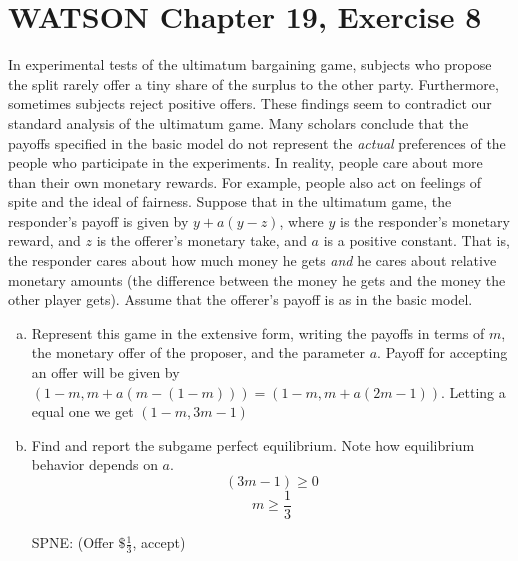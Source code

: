 \documentclass{article}
\begin{document}
\section{WATSON Chapter 19, Exercise 8}
In experimental tests of the ultimatum bargaining game, subjects who propose the split rarely offer a tiny share of the surplus to the other party.
Furthermore, sometimes subjects reject positive offers.
These findings seem to contradict our standard analysis of the ultimatum game.
Many scholars conclude that the payoffs specified in the basic model do not represent the \emph{actual} preferences of the people who participate in the experiments.
In reality, people care about more than their own monetary rewards.
For example, people also act on feelings of spite and the ideal of fairness.
Suppose that in the ultimatum game, the responder's payoff is given by $y + a(y-z)$, where $y$ is the responder's monetary reward, and $z$ is the offerer's monetary take, and $a$ is a positive constant.
That is, the responder cares about how much money he gets \emph{and} he cares about relative monetary amounts (the difference between the money he gets and the money the other player gets).
Assume that the offerer's payoff is as in the basic model.

\begin{enumerate}[(a)]
\item Represent this game in the extensive form, writing the payoffs in terms of $m$, the monetary offer of the proposer, and the parameter $a$.
\newline
Payoff for accepting an offer will be given by $(1-m, m + a(m - (1-m))) = (1-m, m + a(2m-1))$. Letting a equal one we get $(1-m, 3m - 1)$
\begin{center}
\end{center}

\item Find and report the subgame perfect equilibrium. Note how equilibrium behavior depends on $a$.
$$(3m-1) \geq 0 $$
$$m \geq \frac{1}{3} $$

SPNE: (Offer $\$\frac{1}{3}$, accept)

\end{enumerate}
\end{document}

